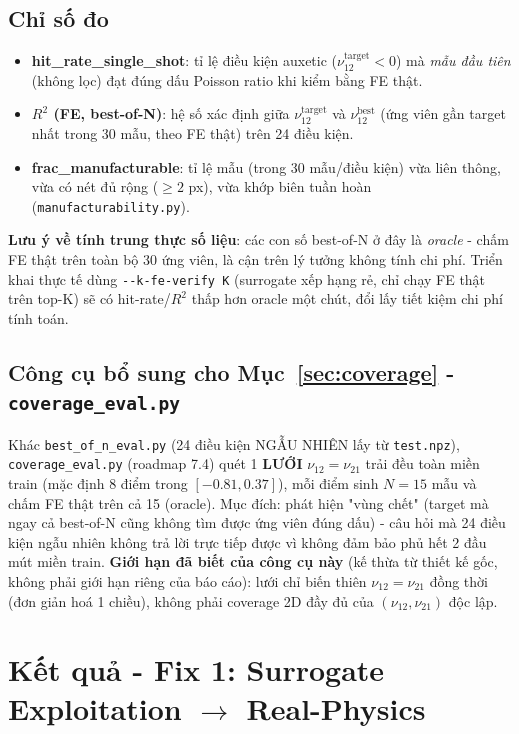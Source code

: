 \documentclass[11pt,a4paper]{article}
\begin{document}
\subsection{Chỉ số đo}
\begin{itemize}[leftmargin=1.4em]
  \item \textbf{hit\_rate\_single\_shot}: tỉ lệ điều kiện auxetic ($\nu_{12}^{\text{target}}<0$)
  mà \emph{mẫu đầu tiên} (không lọc) đạt đúng dấu Poisson ratio khi kiểm bằng FE thật.
  \item \textbf{$R^2$ (FE, best-of-N)}: hệ số xác định giữa $\nu_{12}^{\text{target}}$ và
  $\nu_{12}^{\text{best}}$ (ứng viên gần target nhất trong 30 mẫu, theo FE thật) trên 24 điều
  kiện.
  \item \textbf{frac\_manufacturable}: tỉ lệ mẫu (trong 30 mẫu/điều kiện) vừa liên thông, vừa có
  nét đủ rộng ($\geq2$ px), vừa khớp biên tuần hoàn (\texttt{manufacturability.py}).
\end{itemize}

\textbf{Lưu ý về tính trung thực số liệu}: các con số best-of-N ở đây là \emph{oracle} - chấm
FE thật trên toàn bộ 30 ứng viên, là cận trên lý tưởng không tính chi phí. Triển khai thực tế
dùng \texttt{-{}-k-fe-verify K} (surrogate xếp hạng rẻ, chỉ chạy FE thật trên top-K) sẽ có
hit-rate/$R^2$ thấp hơn oracle một chút, đổi lấy tiết kiệm chi phí tính toán.

\subsection{Công cụ bổ sung cho Mục~\ref{sec:coverage} - \texttt{coverage\_eval.py}}
Khác \texttt{best\_of\_n\_eval.py} (24 điều kiện NGẪU NHIÊN lấy từ \texttt{test.npz}),
\texttt{coverage\_eval.py} (roadmap 7.4) quét 1 \textbf{LƯỚI} $\nu_{12}=\nu_{21}$ trải đều toàn
miền train (mặc định 8 điểm trong $[-0.81, 0.37]$), mỗi điểm sinh $N=15$ mẫu và chấm FE thật trên
cả 15 (oracle). Mục đích: phát hiện "vùng chết" (target mà ngay cả best-of-N cũng không tìm được
ứng viên đúng dấu) - câu hỏi mà 24 điều kiện ngẫu nhiên không trả lời trực tiếp được vì không đảm
bảo phủ hết 2 đầu mút miền train. \textbf{Giới hạn đã biết của công cụ này} (kế thừa từ thiết kế
gốc, không phải giới hạn riêng của báo cáo): lưới chỉ biến thiên $\nu_{12}=\nu_{21}$ đồng thời
(đơn giản hoá 1 chiều), không phải coverage 2D đầy đủ của $(\nu_{12},\nu_{21})$ độc lập.

\section{Kết quả - Fix 1: Surrogate Exploitation $\to$ Real-Physics}
\label{sec:fix1}
\end{document}
